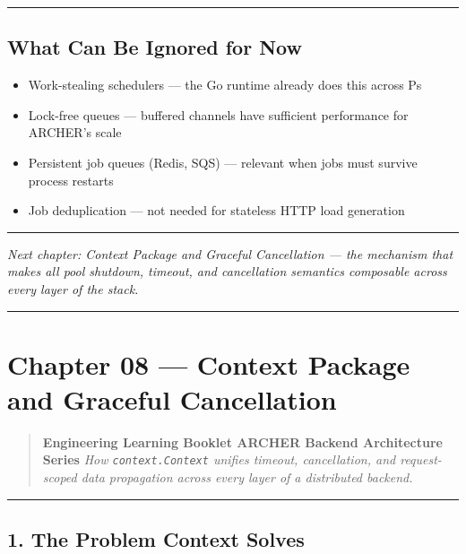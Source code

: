 \documentclass[11pt,a4paper,oneside]{book}
\providecommand{\tightlist}{\setlength{\itemsep}{0pt}\setlength{\parskip}{0pt}}
\begin{document}
\begin{center}\rule{0.5\linewidth}{0.5pt}\end{center}

\subsection{What Can Be Ignored for
Now}

\begin{itemize}
\tightlist
\item
  Work-stealing schedulers --- the Go runtime already does this across
  Ps
\item
  Lock-free queues --- buffered channels have sufficient performance for
  ARCHER's scale
\item
  Persistent job queues (Redis, SQS) --- relevant when jobs must survive
  process restarts
\item
  Job deduplication --- not needed for stateless HTTP load generation
\end{itemize}

\begin{center}\rule{0.5\linewidth}{0.5pt}\end{center}

\emph{Next chapter: Context Package and Graceful Cancellation --- the
mechanism that makes all pool shutdown, timeout, and cancellation
semantics composable across every layer of the stack.}

\begin{center}\rule{0.5\linewidth}{0.5pt}\end{center}

\section{Chapter 08 --- Context Package and Graceful
Cancellation}

\begin{quote}
\textbf{Engineering Learning Booklet \textbar{} ARCHER Backend
Architecture Series} \emph{How \texttt{context.Context} unifies timeout,
cancellation, and request-scoped data propagation across every layer of
a distributed backend.}
\end{quote}

\begin{center}\rule{0.5\linewidth}{0.5pt}\end{center}

\subsection{1. The Problem Context
Solves}
\end{document}
